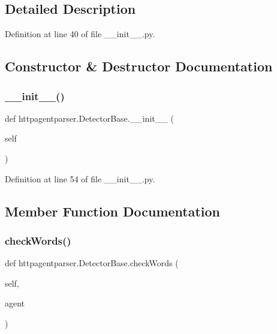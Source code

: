 \subsection{Detailed Description}


Definition at line 40 of file \+\_\+\+\_\+init\+\_\+\+\_\+.\+py.



\subsection{Constructor \& Destructor Documentation}
\hypertarget{classhttpagentparser_1_1_detector_base_aa88a09548fa28a9ff529bb5a844d992a}{}\label{classhttpagentparser_1_1_detector_base_aa88a09548fa28a9ff529bb5a844d992a} 
\subsubsection{\texorpdfstring{\+\_\+\+\_\+init\+\_\+\+\_\+()}{\_\_init\_\_()}}
{\footnotesize\ttfamily def httpagentparser.\+Detector\+Base.\+\_\+\+\_\+init\+\_\+\+\_\+ (\begin{DoxyParamCaption}\item[{}]{self }\end{DoxyParamCaption})}



Definition at line 54 of file \+\_\+\+\_\+init\+\_\+\+\_\+.\+py.



\subsection{Member Function Documentation}
\hypertarget{classhttpagentparser_1_1_detector_base_a77173ed8507f7d27538e7ccaced1473f}{}\label{classhttpagentparser_1_1_detector_base_a77173ed8507f7d27538e7ccaced1473f} 
\subsubsection{\texorpdfstring{check\+Words()}{checkWords()}}
{\footnotesize\ttfamily def httpagentparser.\+Detector\+Base.\+check\+Words (\begin{DoxyParamCaption}\item[{}]{self,  }\item[{}]{agent }\end{DoxyParamCaption})}




